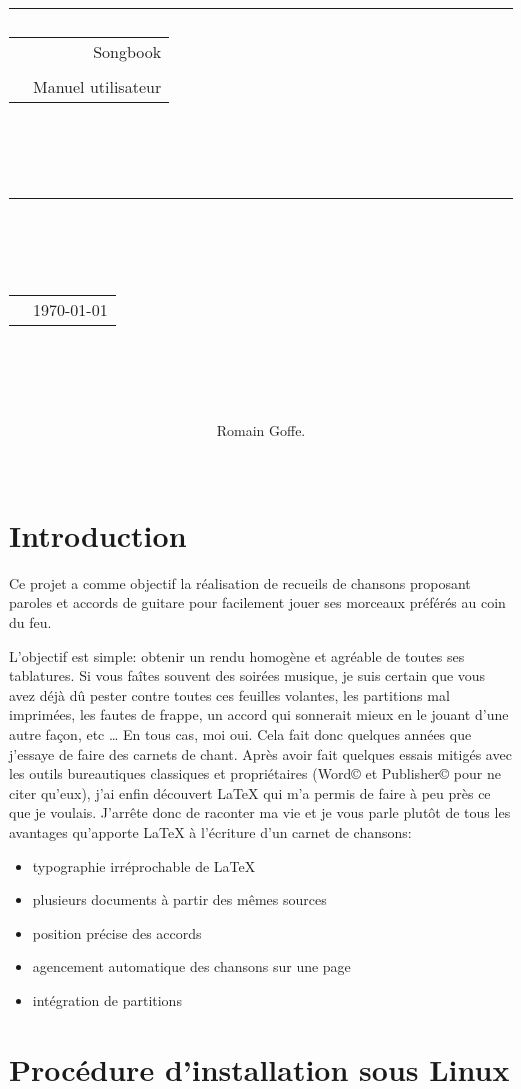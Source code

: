 \documentclass[a4paper,twoside]{article}
\title{
{\rule{\larg}{1mm}}\vspace{7mm}
\begin{tabular}{p{4cm} r}
   & {\Huge {Songbook}} \\
   & \\
   & {\Large Manuel utilisateur}\\
\end{tabular}\\
\vspace{2mm}
{\rule{\larg}{1mm}}
\vspace{2mm} \\
\begin{tabular}{p{11cm} r}
   & {\large  \today}
\end{tabular}\\
\vspace{3.5cm}
}
\author{\begin{tabular}{p{13.7cm}}
Romain Goffe.
\end{tabular}\\
\hline }
\date{}
\begin{document}
\maketitle


\newpage
\tableofcontents
\newpage

\section*{Introduction}

Ce projet a comme objectif la réalisation de recueils de chansons
proposant paroles et accords de guitare pour facilement jouer ses
morceaux préférés au coin du feu.

L'objectif est simple: obtenir un rendu homogène et agréable de toutes
ses tablatures. Si vous faîtes souvent des soirées musique, je suis
certain que vous avez déjà dû pester contre toutes ces feuilles
volantes, les partitions mal imprimées, les fautes de frappe, un
accord qui sonnerait mieux en le jouant d'une autre façon, etc \dots
En tous cas, moi oui. Cela fait donc quelques années que j'essaye de
faire des carnets de chant. Après avoir fait quelques essais mitigés
avec les outils bureautiques classiques et propriétaires (Word© et
Publisher© pour ne citer qu'eux), j'ai enfin découvert LaTeX qui m'a
permis de faire à peu près ce que je voulais. J'arrête donc de
raconter ma vie et je vous parle plutôt de tous les avantages
qu'apporte LaTeX à l'écriture d'un carnet de chansons:

\begin{itemize}
\item typographie irréprochable de LaTeX 
\item plusieurs documents à partir des mêmes sources
\item position précise des accords
\item agencement automatique des chansons sur une page
\item intégration de partitions
\end{itemize}

\section{Procédure d'installation sous Linux}
\end{document}
